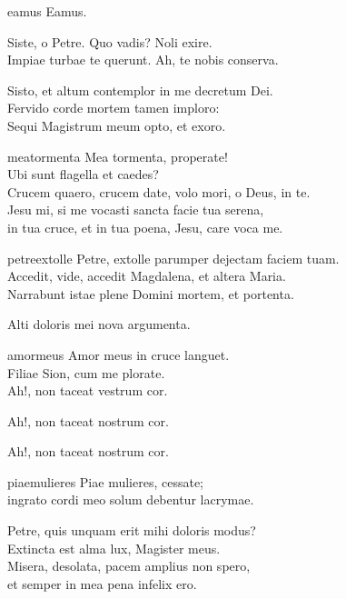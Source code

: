 \documentclass[tocstyle=ref-genre]{ees}
\begin{document}
{\begin{movement}{eamus}
  \voice[Petrus]
  Eamus.

  Siste, o Petre. Quo vadis? Noli exire.\\
  Impiae turbae te querunt. Ah, te nobis conserva.

  \voice[Petrus]
  Sisto, et altum contemplor in me decretum Dei.\\
  Fervido corde mortem tamen imploro:\\
  Sequi Magistrum meum opto, et exoro.
\end{movement}

\begin{movement}{meatormenta}
  \voice[Petrus]
  Mea tormenta, properate!\\
  Ubi sunt flagella et caedes?\\
  Crucem quaero, crucem date, volo mori, o Deus, in te.\\
  Jesu mi, si me vocasti sancta facie tua serena,\\
  in tua cruce, et in tua poena, Jesu, care voca me.
\end{movement}

\begin{movement}{petreextolle}
  Petre, extolle parumper dejectam faciem tuam.\\
  Accedit, vide, accedit Magdalena, et altera Maria.\\
  Narrabunt istae plene Domini mortem, et portenta.

  \voice[Petrus]
  Alti doloris mei nova argumenta.
\end{movement}

\begin{movement}{amormeus}
  Amor meus in cruce languet.\\
  Filiae Sion, cum me plorate.\\
  Ah!, non taceat vestrum cor.

  Ah!, non taceat nostrum cor.

  Ah!, non taceat nostrum cor.
\end{movement}

\begin{movement}{piaemulieres}
  \voice[Petrus]
  Piae mulieres, cessate;\\
  ingrato cordi meo solum debentur lacrymae.

  \voice[M. Magdalena]
  Petre, quis unquam erit mihi doloris modus?\\
  Extincta est alma lux, Magister meus.\\
  Misera, desolata, pacem amplius non spero,\\
  et semper in mea pena infelix ero.


\end{movement}}
\end{document}
